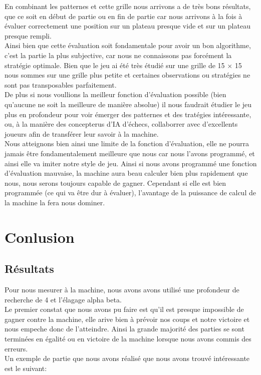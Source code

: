 \documentclass{article}
\begin{document}
En combinant les patternes et cette grille nous arrivons a de très bons résultats, que ce soit en début de partie ou en fin de partie car nous arrivons
à la fois à évaluer correctement une position sur un plateau presque vide et sur un plateau presque rempli.\\

Ainsi bien que cette évaluation soit fondamentale pour avoir un bon algorithme, c'est la partie la plus subjective, car nous ne connaissons pas forcément 
la stratégie optimale. Bien que le jeu ai été très étudié sur une grille de 15 $\times$ 15 nous sommes sur une grille plus petite et certaines observations
ou stratégies ne sont pas transposables parfaitement.\\
De plus si nous voullions la meilleur fonction d'évaluation possible (bien qu'aucune ne soit la meilleure de manière absolue) il nous faudrait
étudier le jeu plus en profondeur pour voir émerger des patternes et des tratégies intéressante, ou, à la manière des concepterus d'IA d'échecs, collaborrer
avec d'excellents joueurs afin de transférer leur savoir à la machine.\\

Nous atteignons bien ainsi une limite de la fonction d'évaluation, elle ne pourra jamais être fondamentalement meilleure que nous car nous l'avons
programmé, et ainsi elle va imiter notre style de jeu. Ainsi si nous avons programmé une fonction d'évaluation mauvaise, la machine aura beau calculer bien 
plus rapidement que nous, nous serons toujours capable de gagner. Cependant si elle est bien programmée (ce qui va être dur à évaluer), l'avantage de la puissance
de calcul de la machine la fera nous dominer.

\pagebreak
\section{Conlusion}
\subsection{Résultats}

Pour nous mesurer à la machine, nous avons avons utilisé une profondeur de recherche de 4 et l'élagage alpha beta.\\
Le premier constat que nous avons pu faire est qu'il est presque impossible de gagner contre la machine, elle arive bien à prévoir nos coups
et notre victoire et nous empeche donc de l'atteindre. Ainsi la grande majorité des parties se sont terminées en égalité ou en victoire
de la machine lorsque nous avons commis des erreurs.\\
Un exemple de partie que nous avons réalisé que nous avons trouvé intéressante est le suivant:
\end{document}
